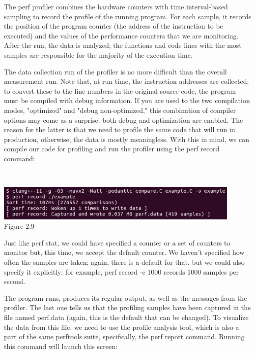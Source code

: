
The perf profiler combines the hardware counters with time interval-based sampling to record the profile of the running program. For each sample, it records the position of the program counter (the address of the instruction to be executed) and the values of the performance counters that we are monitoring. After the run, the data is analyzed; the functions and code lines with the most samples are responsible for the majority of the execution time.

The data collection run of the profiler is no more difficult than the overall measurement run. Note that, at run time, the instruction addresses are collected; to convert these to the line numbers in the original source code, the program must be compiled with debug information. If you are used to the two compilation modes, "optimized" and "debug non-optimized," this combination of compiler options may come as a surprise: both debug and optimization are enabled. The reason for the latter is that we need to profile the same code that will run in production, otherwise, the data is mostly meaningless. With this in mind, we can compile our code for profiling and run the profiler using the perf record command:

\hspace*{\fill} \\ %
\begin{center}
\includegraphics[width=0.9\textwidth]{content/1/chapter2/images/9.jpg}\\
Figure 2.9
\end{center}

Just like perf stat, we could have specified a counter or a set of counters to monitor but, this time, we accept the default counter. We haven't specified how often the samples are taken; again, there is a default for that, but we could also specify it explicitly: for example, perf record -c 1000 records 1000 samples per second.

The program runs, produces its regular output, as well as the messages from the profiler. The last one tells us that the profiling samples have been captured in the file named perf.data (again, this is the default that can be changed). To visualize the data from this file, we need to use the profile analysis tool, which is also a part of the same perftools suite, specifically, the perf report command. Running this command will launch this screen:

